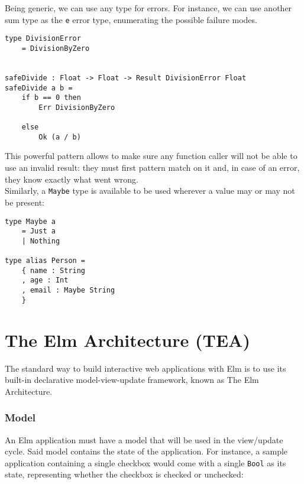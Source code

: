 Being generic, we can use any type for errors. For instance, we can use another sum type as the \texttt{e} error type, enumerating the possible failure modes. 
\begin{verbatim}
type DivisionError
    = DivisionByZero


safeDivide : Float -> Float -> Result DivisionError Float
safeDivide a b =
    if b == 0 then
        Err DivisionByZero

    else
        Ok (a / b)
\end{verbatim}
This powerful pattern allows to make sure any function caller will not be able to use an invalid result: they must first pattern match on it and, in case of an error, they know exactly what went wrong.\\

Similarly, a \texttt{Maybe} type is available to be used wherever a value may or may not be present:
\begin{verbatim}
type Maybe a
    = Just a
    | Nothing

type alias Person =
    { name : String
    , age : Int
    , email : Maybe String
    }
\end{verbatim}

\section{The Elm Architecture (TEA)}

The standard way to build interactive web applications with Elm is to use its built-in declarative model-view-update framework, known as The Elm Architecture.

\subsubsection{Model}
An Elm application must have a model that will be used in the view/update cycle. Said model contains the state of the application. For instance, a sample application containing a single checkbox would come with a single \texttt{Bool} as its state, representing whether the checkbox is checked or unchecked:

